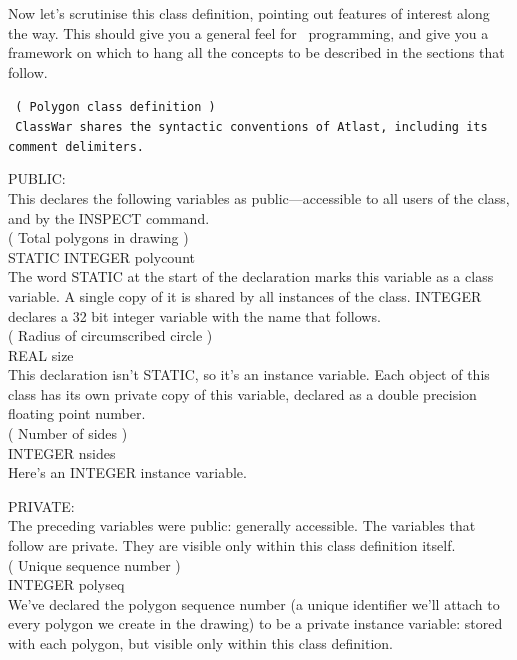 \documentclass{article}
\begin{document}
Now let's scrutinise this class definition, pointing out features of
interest along the way.  This should give you a general feel for \cw\
programming, and give you a framework on which to hang all the
concepts to be described in the sections that follow.

\newcommand{\cm}[1]{{\cmt \baselineskip 3pt #1 }}
\newcommand{\ta}{\hspace*{2em}}
\newcommand{\tb}{\hspace*{4em}}
\newcommand{\tc}{\hspace*{6em}}

{\small \tt
(    Polygon class definition   )\\
\cm{ClassWar shares the syntactic conventions of Atlast, including
    its comment delimiters.}

\ta PUBLIC:\\
\cm{This declares the following variables as
    public---accessible to all users of the class, and by the
    INSPECT command.}\\
\tb     ( Total polygons in drawing )\\
\tb     STATIC INTEGER polycount\\
\cm{The word STATIC at the start of the declaration marks this
    variable as a class variable.  A single copy of it is shared
    by all instances of the class.  INTEGER declares a 32 bit integer
    variable with the name that follows.}\\
\tb     ( Radius of circumscribed circle )\\
\tb     REAL size\\
\cm{This declaration isn't STATIC, so it's an instance variable.  Each
    object of this class has its own private copy of this variable,
    declared as a double precision floating point
    number.}\\
\tb     ( Number of sides )\\
\tb     INTEGER nsides\\
\cm{Here's an INTEGER instance variable.}

\ta PRIVATE:\\
\cm{The preceding variables were public: generally accessible.  The
    variables that follow are private.  They are visible only within
    this class definition itself.}\\
\tb     ( Unique sequence number )\\
\tb     INTEGER polyseq\\
\cm{We've declared the polygon sequence number (a unique identifier
    we'll attach to every polygon we create in the drawing) to be
    a private instance variable: stored with each polygon, but visible
    only within this class definition.}

}
\end{document}
